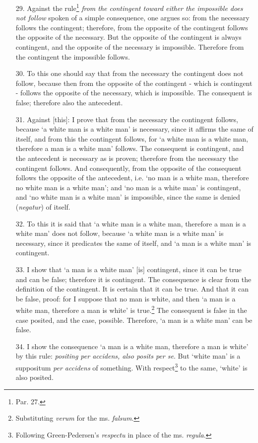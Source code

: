 \begin{enumerate}
\item[29.] Against the rule\footnote{Par. 27.} \textit{from the contingent toward either the impossible does not follow} spoken of a simple consequence, one argues so: from the necessary follows the contingent; therefore, from the opposite of the contingent follows the opposite of the necessary. But the opposite of the contingent is always contingent, and the opposite of the necessary is impossible. Therefore from the contingent the impossible follows.
\item[30.] To this one should say that from the necessary the contingent does not follow, because then from the opposite of the contingent - which is contingent - follows the opposite of the necessary, which is impossible. The consequent is false; therefore also the antecedent.
\item[31.] Against [this]: I prove that from the necessary the contingent follows, because `a white man is a white man' is necessary, since it affirms the same of itself, and from this the contingent follows, for `a white man is a white man, therefore a man is a white man' follows. The consequent is contingent, and the antecedent is necessary as is proven; therefore from the necessary the contingent follows. And consequently, from the opposite of the consequent follows the opposite of the antecedent, i.e. `no man is a white man, therefore no white man is a white man'; and `no man is a white man' is contingent, and `no white man is a white man' is impossible, since the same is denied (\textit{negatur}) of itself.
\item[32.] To this it is said that `a white man is a white man, therefore a man is a white man' does not follow, because `a white man is a white man' is necessary, since it predicates the same of itself, and `a man is a white man' is contingent.
\item[33.] I show that `a man is a white man' [is] contingent, since it can be true and can be false; therefore it is contingent. The consequence is clear from the definition of the contingent. It is certain that it can be true. And that it can be false, proof: for I suppose that no man is white, and then `a man is a white man, therefore a man is white' is true.\footnote{Substituting \textit{verum} for the ms. \textit{falsum}.} The consequent is false in the case posited, and the case, possible. Therefore, `a man is a white man' can be false.
\item[34.] I show the consequence `a man is a white man, therefore a man is white' by this rule: \textit{positing per accidens, also posits per se}. But `white man' is a suppositum \textit{per accidens} of something. With respect\footnote{Following Green-Pedersen's \textit{respectu} in place of the ms. \textit{regula}.} to the same, `white' is also posited.

\end{enumerate}
